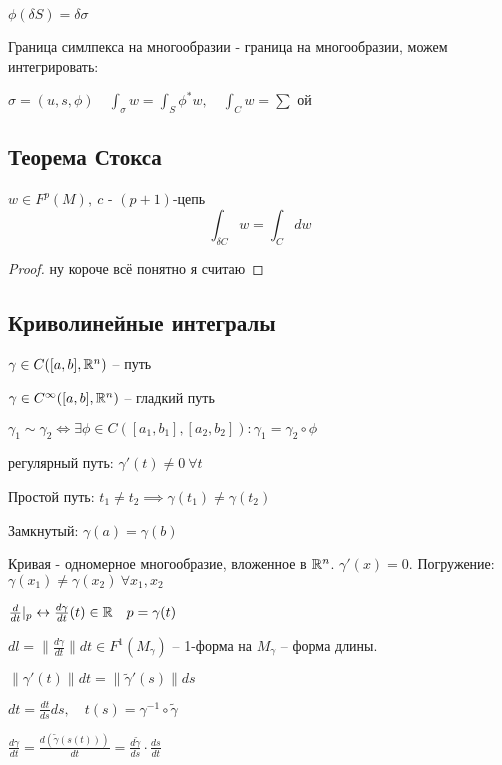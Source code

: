   $\phi(\delta S) = \delta \sigma$

  Граница симлпекса на многообразии - граница на многообразии, можем интегрировать:

  $\sigma = (u, s,  \phi) \quad \int_\sigma w = \int_S \phi^* w , \quad \int_C w  = \sum$ ой 

  \subsection*{Теорема Стокса}

  \begin{theorem}
    $w \in F^p(M), \ c $ - $(p+1)$-цепь
    $$\int_{\delta C} w = \int_C dw$$
  \end{theorem}

  \begin{proof}
    ну короче всё понятно я считаю
  \end{proof}

  \subsection*{Криволинейные интегралы}

  $\gamma \in C([a,b], \mathbb{R}^n)$ -- путь

  $\gamma \in C^\infty([a,b], \mathbb{R}^n)$ -- гладкий путь

  $\gamma_1 \sim \gamma_2 \iff \exists \phi \in C([a_1,b_1], [a_2,b_2]): \gamma_1 = \gamma_2 \circ \phi$
 
  регулярный путь: $\gamma'(t) \neq 0 \ \forall t$

  Простой путь: $t_1 \neq t_2 \implies \gamma(t_1) \neq \gamma(t_2)$

  Замкнутый: $\gamma(a) = \gamma(b)$

  Кривая - одномерное многообразие, вложенное в $\mathbb{R}^n$. $\gamma'(x) = 0$. Погружение: $\gamma(x_1) \neq \gamma(x_2) \ \forall x_1, x_2$

  $\frac{d}{dt}|_p \leftrightarrow \frac{d\gamma}{dt}(t) \in \mathbb{R} \quad p = \gamma(t)$

  $dl = \| \frac{d\gamma}{dt}\| dt \in F^1(M_\gamma)$ -- 1-форма на $M_\gamma$ -- форма длины.

  $\| \gamma'(t)\| dt = \| \widetilde{\gamma}'(s)\| ds$

  $dt = \frac{dt}{ds}ds, \quad t(s) = \gamma^{-1}\circ \widetilde{\gamma}$

  $\frac{d\gamma}{dt} = \frac{d(\widetilde{\gamma}(s(t)))}{dt} = \frac{d\widetilde{\gamma}}{ds}\cdot \frac{ds}{dt}$

